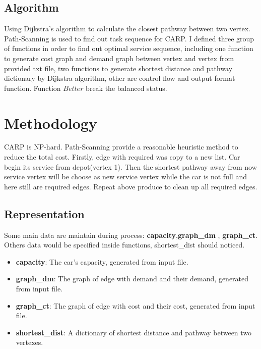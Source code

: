 \documentclass[conference,compsoc]{IEEEtran}
\begin{document}
\subsection{Algorithm}
Using Dijkstra's algorithm to calculate the closest pathway between two vertex.
Path-Scanning is used to find out task sequence for CARP. I defined three group
of functions in order to find out optimal service sequence, including one
function to generate cost graph and demand graph between vertex and vertex
from provided txt file, two functions to generate shortest distance and pathway
dictionary by Dijkstra algorithm, other are control flow and output format
function. Function $Better$ break the balanced status.


\section{Methodology}
CARP is NP-hard. Path-Scanning provide a reasonable heuristic method to reduce
the total cost. Firstly, edge with required was copy to a new list. Car begin
its service from depot(vertex 1). Then the shortest pathway away from now
service vertex will be choose as new service vertex while the car is not full
and here still are required edges. Repeat above produce to clean up all required
edges.

\subsection{Representation}
Some main data are maintain during process: \textbf{capacity},\textbf{graph\_dm}
, \textbf{graph\_ct}.
Others data would be specified inside functions, shortest\_dist should noticed.

\begin{itemize}
  \item \textbf{capacity}: The car's capacity, generated from input file.
  \item \textbf{graph\_dm}: The graph of edge with demand and their demand,
  generated from input file.
  \item \textbf{graph\_ct}: The graph of edge with cost and their cost,
  generated from input file.
  \item \textbf{shortest\_dist}: A dictionary of shortest distance and pathway
  between two vertexes. 
\end{itemize}
\end{document}
